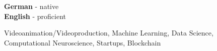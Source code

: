 \documentclass[9pt]{cvstyle}
\begin{document}
\begin{minipage}[t]{0.3\textwidth}
	\vspace{-\baselineskip} 

	
	\textbf{German} - native\\
	\textbf{English} - proficient
\end{minipage}
\begin{minipage}[t]{0.7\textwidth}
	\vspace{-\baselineskip} 

	
	Videoanimation/Videoproduction, Machine Learning, Data Science, Computational Neuroscience, Startups, Blockchain
\end{minipage}
\hfill
\end{document}
